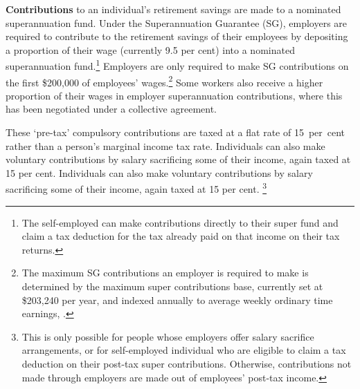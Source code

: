 \begin{figure}[!t]
\begin{minipage}[t]{0.30\columnwidth}
\vspace{5pt}
\end{minipage}
\end{figure}

\textbf{Contributions} to an individual’s retirement savings are made to a nominated superannuation fund. Under the Superannuation Guarantee (SG), employers are required to contribute to the retirement savings of their employees by depositing a proportion of their wage (currently 9.5 per cent) into a nominated superannuation fund.\footnote{The self-employed can make contributions directly to their super fund and claim a tax deduction for the tax already paid on that income on their tax returns.} Employers are only required to make SG contributions on the first \$200,000 of employees’ wages.\footnote{The maximum SG contributions an employer is required to make is determined by the maximum super contributions base, currently set at \$203,240 per year, and indexed annually to average weekly ordinary time earnings, \textcite{ATO2015MaxSuperContrBase}.} Some workers also receive a higher proportion of their wages in employer superannuation contributions, where this has been negotiated under a collective agreement.


These ‘pre-tax’ compulsory contributions are taxed at a flat rate of 15~per~cent rather than a person’s marginal income tax rate. Individuals can also make voluntary contributions by salary sacrificing some of their income, again taxed at 15 per cent. Individuals can also make voluntary contributions by salary sacrificing some of their income, again taxed at 15 per cent.%
\footnote{%
This is only possible for people whose employers offer salary sacrifice arrangements, or for self-employed individual who are eligible to claim a tax deduction on their post-tax super contributions. Otherwise, contributions not made through employers are made out of employees’ post-tax income.%
}  


